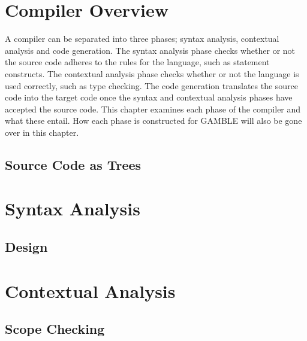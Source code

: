 \chapter{Compiler Overview}
A compiler can be separated into three phases; syntax analysis, contextual analysis and code generation.
The syntax analysis phase checks whether or not the source code adheres to the rules for the language, such as statement constructs.
The contextual analysis phase checks whether or not the language is used correctly, such as type checking.
The code generation translates the source code into the target code once the syntax and contextual analysis phases have accepted the source code.
This chapter examines each phase of the compiler and what these entail.
How each phase is constructed for GAMBLE will also be gone over in this chapter. %

\section{Source Code as Trees}


\chapter{Syntax Analysis}
\section{Design}









\chapter{Contextual Analysis}



\section{Scope Checking}


